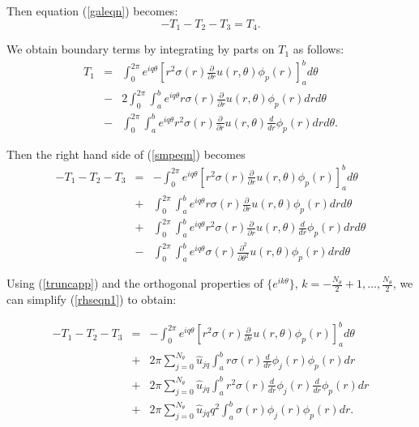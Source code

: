 Then equation (\ref{galeqn}) becomes:
\begin{equation}\label{smpeqn}
- T_1 - T_2 - T_3 = T_4.
\end{equation}

We obtain boundary terms by integrating by parts on $T_1$ as
follows:
\begin{eqnarray}
T_1 &=& \int_0^{2\pi}e^{iq\theta} \left[ r^2\sigma(r)\frac{\partial}{\partial r}u(r,\theta)\phi_p(r)\right]_a^b d\theta \\
&-&2 \int_0^{2\pi}\int_a^b e^{iq\theta} r \sigma(r)\frac{\partial}{\partial r}u(r,\theta)\phi_p(r)drd\theta \\
&-& \int_0^{2\pi}\int_a^b e^{iq\theta} r^2\sigma(r)\frac{\partial}{\partial r}u(r,\theta) \frac{d}{dr}\phi_p(r)drd\theta.
\end{eqnarray}

Then the right hand side of (\ref{smpeqn}) becomes
\begin{eqnarray}\label{rhseqn1}
- T_1 - T_2 - T_3 &=& - \int_0^{2\pi}e^{iq\theta} \left[ r^2\sigma(r)\frac{\partial}{\partial r}u(r,\theta)\phi_p(r)\right]_a^b d\theta \\
&+& \int_0^{2\pi}\int_a^b e^{iq\theta} r \sigma(r) \frac{\partial}{\partial r}u(r,\theta)\phi_p(r)drd\theta \\
&+& \int_0^{2\pi}\int_a^b e^{iq\theta} r^2 \sigma(r) \frac{\partial}{\partial r}u(r,\theta) \frac{d}{dr}\phi_p(r)drd\theta \\
&-& \int_0^{2\pi}\int_a^b e^{iq\theta} \sigma(r) \frac{\partial^2}{\partial \theta^2}u(r, \theta) \phi_p(r) dr d\theta
\end{eqnarray}

Using (\ref{truncapp}) and the orthogonal properties of
$\{e^{ik\theta}\}$, $k =
-\frac{N_\theta}{2}+1,\ldots,\frac{N_\theta}{2}$, we can simplify
(\ref{rhseqn1}) to obtain:

\begin{eqnarray}\label{rhseqn2}
- T_1 - T_2 - T_3 &=& - \int_0^{2\pi}e^{iq\theta} \left[ r^2\sigma(r)\frac{\partial}{\partial r}u(r,\theta)\phi_p(r)\right]_a^b d\theta \\
&+& 2\pi \sum_{j=0}^{N_\theta} \hat{u}_{jq} \int_a^b r \sigma(r) \frac{d}{dr} \phi_j(r) \phi_p(r) dr \\
&+& 2\pi \sum_{j=0}^{N_\theta} \hat{u}_{jq} \int_a^b r^2 \sigma(r) \frac{d}{dr} \phi_j(r) \frac{d}{dr}\phi_p(r) dr \\
&+& 2\pi \sum_{j=0}^{N_\theta} \hat{u}_{jq} q^2 \int_a^b \sigma(r) \phi_j(r) \phi_p(r) dr.
\end{eqnarray}


